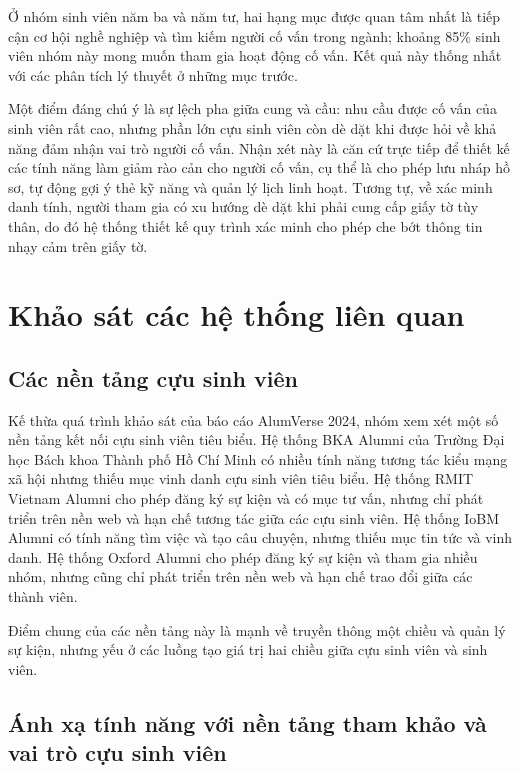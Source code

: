 \documentclass[12pt,a4paper,oneside]{report}
\begin{document}
Ở nhóm sinh viên năm ba và năm tư, hai hạng mục được quan tâm nhất là tiếp cận cơ hội nghề nghiệp và tìm kiếm người cố vấn trong ngành; khoảng 85\% sinh viên nhóm này mong muốn tham gia hoạt động cố vấn. Kết quả này thống nhất với các phân tích lý thuyết ở những mục trước.

Một điểm đáng chú ý là sự lệch pha giữa cung và cầu: nhu cầu được cố vấn của sinh viên rất cao, nhưng phần lớn cựu sinh viên còn dè dặt khi được hỏi về khả năng đảm nhận vai trò người cố vấn. Nhận xét này là căn cứ trực tiếp để thiết kế các tính năng làm giảm rào cản cho người cố vấn, cụ thể là cho phép lưu nháp hồ sơ, tự động gợi ý thẻ kỹ năng và quản lý lịch linh hoạt. Tương tự, về xác minh danh tính, người tham gia có xu hướng dè dặt khi phải cung cấp giấy tờ tùy thân, do đó hệ thống thiết kế quy trình xác minh cho phép che bớt thông tin nhạy cảm trên giấy tờ.

\section{Khảo sát các hệ thống liên quan}

\subsection{Các nền tảng cựu sinh viên}

Kế thừa quá trình khảo sát của báo cáo AlumVerse 2024, nhóm xem xét một số nền tảng kết nối cựu sinh viên tiêu biểu. Hệ thống BKA Alumni của Trường Đại học Bách khoa Thành phố Hồ Chí Minh có nhiều tính năng tương tác kiểu mạng xã hội nhưng thiếu mục vinh danh cựu sinh viên tiêu biểu. Hệ thống RMIT Vietnam Alumni cho phép đăng ký sự kiện và có mục tư vấn, nhưng chỉ phát triển trên nền web và hạn chế tương tác giữa các cựu sinh viên. Hệ thống IoBM Alumni có tính năng tìm việc và tạo câu chuyện, nhưng thiếu mục tin tức và vinh danh. Hệ thống Oxford Alumni cho phép đăng ký sự kiện và tham gia nhiều nhóm, nhưng cũng chỉ phát triển trên nền web và hạn chế trao đổi giữa các thành viên.

Điểm chung của các nền tảng này là mạnh về truyền thông một chiều và quản lý sự kiện, nhưng yếu ở các luồng tạo giá trị hai chiều giữa cựu sinh viên và sinh viên.

\subsection{Ánh xạ tính năng với nền tảng tham khảo và vai trò cựu sinh viên}
\end{document}
